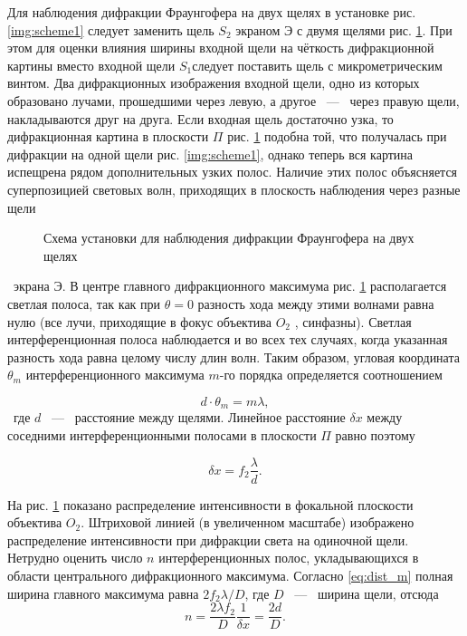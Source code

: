Для наблюдения дифракции Фраунгофера на двух щелях в установке
рис. \ref{img:scheme1} следует заменить щель $S_2$ экраном $Э$ с двумя щелями рис. \ref{img:slits}.
При этом для оценки влияния ширины входной щели на чёткость дифракционной картины вместо входной щели $S_1$следует поставить щель
с микрометрическим винтом. Два дифракционных изображения входной
щели, одно из которых образовано лучами, прошедшими через левую, а
другое ~---~ через правую щели, накладываются друг на друга.
Если входная щель достаточно узка, то дифракционная картина
в плоскости $\Pi$ рис. \ref{img:slits} подобна той, что получалась при дифракции на
одной щели рис. \ref{img:scheme1}, однако теперь вся картина испещрена рядом дополнительных узких полос. Наличие этих полос объясняется суперпозицией
световых волн, приходящих в плоскость наблюдения через разные щели

\begin{figure}[h]
  \caption{Схема установки для наблюдения дифракции Фраунгофера на двух щелях}
  \label{img:slits}
\end{figure} 
\
экрана Э. В центре главного дифракционного максимума рис. \ref{img:slits} располагается светлая полоса, так как при $\theta = 0$ разность хода между этими
волнами равна нулю (все лучи, приходящие в фокус объектива $O_2$ , синфазны). Светлая интерференционная полоса наблюдается и во всех тех
случаях, когда указанная разность хода равна целому числу длин волн.
Таким образом, угловая координата $\theta_m$ интерференционного максимума $m$-го порядка определяется соотношением

\begin{equation}
  d \cdot \theta_m = m\lambda,
\end{equation} \label{eq:fraunmax}
\
где $d$ ~---~ расстояние между щелями.
Линейное расстояние $\delta x$ между соседними интерференционными 
полосами в плоскости $\Pi$ равно поэтому

\begin{equation}
  \delta x = f_2 \frac{\lambda}{d}.
\end{equation} \label{eq:fraundx}

На рис. \ref{img:slits} показано распределение интенсивности в фокальной 
плоскости объектива $O_2$. Штриховой линией (в увеличенном масштабе) 
изображено распределение интенсивности при дифракции света на одиночной
щели.
Нетрудно оценить число $n$ интерференционных полос, 
укладывающихся в области центрального дифракционного максимума. 
Согласно \eqref{eq:dist_m} полная ширина главного максимума равна $ 2f_2 \lambda /D$, где $D$ ~---~ 
ширина щели, отсюда
\begin{equation}
  n = \frac{2\lambda f_2}{D} \frac{1}{\delta x} = \frac{2d}{D}.
\end{equation}\label{eq:intnum}


